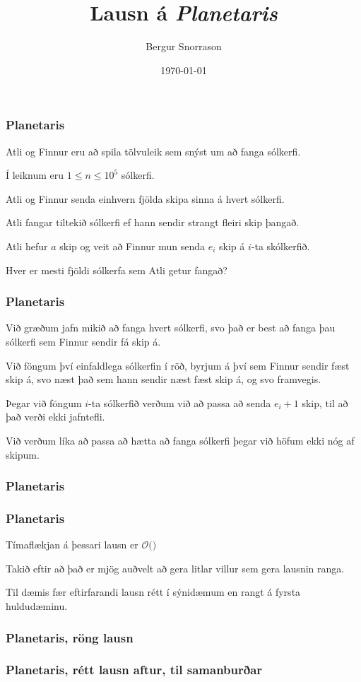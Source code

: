 \title{Lausn á \emph{Planetaris}}
\author{Bergur Snorrason}
\date{\today}



\frame{\titlepage}

{
	\frametitle{Planetaris}
	{
		\item<1-> Atli og Finnur eru að spila tölvuleik sem snýst um að fanga sólkerfi.
		\item<2-> Í leiknum eru $1 \leq n \leq 10^5$ sólkerfi.
		\item<3-> Atli og Finnur senda einhvern fjölda skipa sinna á hvert sólkerfi.
		\item<4-> Atli fangar tiltekið sólkerfi ef hann sendir strangt fleiri skip þangað.
		\item<5-> Atli hefur $a$ skip og veit að Finnur mun senda $e_i$ skip á $i$-ta skólkerfið.
		\item<6-> Hver er mesti fjöldi sólkerfa sem Atli getur fangað?
	}
}

{
	\frametitle{Planetaris}
	{
		\item<1-> Við græðum jafn mikið að fanga hvert sólkerfi, svo það er best að fanga þau sólkerfi sem Finnur sendir fá skip á.
		\item<2-> Við föngum því einfaldlega sólkerfin í röð, byrjum á því sem Finnur sendir fæst skip á,
					svo næst það sem hann sendir næst fæst skip á, og svo framvegis.
		\item<3-> Þegar við föngum $i$-ta sólkerfið verðum við að passa að senda $e_i + 1$ skip, til að það verði ekki jafntefli.
		\item<4-> Við verðum líka að passa að hætta að fanga sólkerfi þegar við höfum ekki nóg af skipum.
	}
}

{
	\frametitle{Planetaris}
}

{
	\frametitle{Planetaris}
	{
		\item<1-> Tímaflækjan á þessari lausn er $\mathcal{O}($$)$ \onslide<2->{sökum röðunar.}
		\item<3-> Takið eftir að það er mjög auðvelt að gera litlar villur sem gera lausnin ranga.
		\item<4-> Til dæmis fær eftirfarandi lausn rétt í sýnidæmum en rangt á fyrsta huldudæminu.
	}
}

{
	\frametitle{Planetaris, röng lausn}
}

{
	\frametitle{Planetaris, rétt lausn aftur, til samanburðar}
}

{
}


